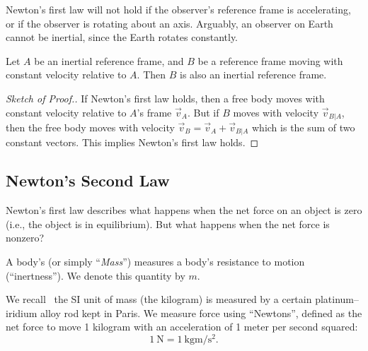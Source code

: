 \begin{rmk}
Newton's first law will not hold if the observer's reference frame is
accelerating, or if the observer is rotating about an axis. Arguably, an
observer on Earth cannot be inertial, since the Earth rotates constantly.
\end{rmk}

\begin{thm}
Let $A$ be an inertial reference frame, and $B$ be a reference frame
moving with constant velocity relative to $A$. Then $B$ is also an
inertial reference frame.
\end{thm}
\begin{proof}[Sketch of Proof.]
If Newton's first law holds, then a free body moves with constant velocity
relative to $A$'s frame $\vec{v}_{A}$. But if $B$ moves with velocity
$\vec{v}_{B|A}$, then the free body moves with velocity
$\vec{v}_{B}=\vec{v}_{A}+\vec{v}_{B|A}$ which is the sum of two constant
vectors. This implies Newton's first law  holds.
\end{proof}

\subsection{Newton's Second Law}

\M
Newton's first law  describes what happens when
the net force on an object is zero (i.e., the object is in
equilibrium). But what happens when the net force is nonzero?

\begin{defn}
A body's  (or simply ``\emph{Mass\/}'') measures a
body's resistance to motion (``inertness''). We denote this quantity by $m$.
\end{defn}

\begin{rmk}
We recall~ the SI unit of mass (the
kilogram) is measured by a certain platinum--iridium alloy rod kept in
Paris. We measure force using ``Newtons'', defined as the net force to
move 1 kilogram with an acceleration of 1 meter per second squared:
\begin{equation}
\SI{1}{\newton}=\SI{1}{\kilo\gram\meter\per\second\squared}.
\end{equation}
\end{rmk}

